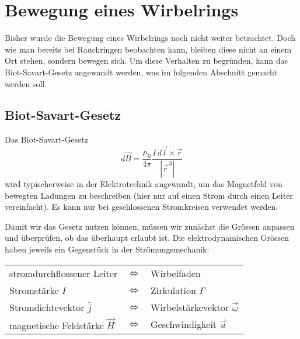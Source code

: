 %
%
%
\section{Bewegung eines Wirbelrings\label{Wirbelringe:Bewegung}}

Bisher wurde die Bewegung eines Wirbelrings noch nicht weiter betrachtet. 
Doch wie man bereits bei Rauchringen beobachten kann, bleiben diese nicht an einem Ort stehen, sondern bewegen sich. 
Um diese Verhalten zu begründen, kann das Biot-Savart-Gesetz \cite{Wirbelringe:FuehrerdurchdieStroemungslehre} angewandt werden, was im folgenden Abschnitt gemacht werden soll.

\subsection{Biot-Savart-Gesetz}

Das Biot-Savart-Gesetz
\[
d \vec{B}
=
\frac{\mu_0}{4\pi}\frac{I \,d \vec{l} \times \vec{r}}{\left\lvert \vec{r}^{\,3}\right\rvert }
\]  %
wird typischerweise in der Elektrotechnik angewandt, um das Magnetfeld von bewegten Ladungen zu beschreiben (hier nur auf einen Strom durch einen Leiter vereinfacht).
Es kann nur bei geschlossenen Stromkreisen verwendet werden. 

Damit wir das Gesetz nutzen können, müssen wir zunächst die Grössen anpassen und überprüfen, ob das überhaupt erlaubt ist. 
Die elektrodynamischen Grössen haben jeweils ein Gegenstück in der Strömungsmechanik:

\begin{center}
    \begin{tabular}{lcl}
    stromdurchflossener Leiter          & \(\Leftrightarrow \) & Wirbelfaden \\
    Stromstärke \(I\)                   & \(\Leftrightarrow \) & Zirkulation \(\Gamma\) \\
    Stromdichtevektor \(\hat{j}\)       & \(\Leftrightarrow \) & Wirbelstärkevektor \(\vec{\omega}\)\\
    magnetische Feldstärke \(\vec{H}\)  & \(\Leftrightarrow \) & Geschwindigkeit \(\vec{u}\) \\
    \end{tabular}
\end{center}

